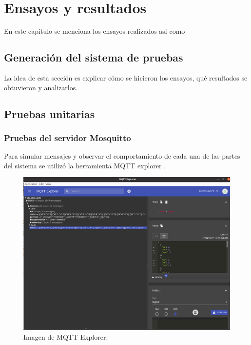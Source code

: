 
\chapter{Ensayos y resultados} %

En este capítulo se menciona los ensayos realizados asi como 

\label{Chapter4} %


\section{Generación del sistema de pruebas}
\label{sec:pruebasHW}

La idea de esta sección es explicar cómo se hicieron los ensayos, qué resultados se obtuvieron y analizarlos.
\section{Pruebas unitarias}
\subsection{Pruebas del servidor Mosquitto}
Para simular mensajes y observar el comportamiento de cada una de las partes del sistema se utilizó la herramienta MQTT explorer   \citep{WEBSITE:29}.

\begin{figure}[ht]
	\centering
	\includegraphics[scale=.25]{./Figures/mqtt-explorer.png}
	\caption{Imagen de MQTT Explorer.}
	\label{fig:MQTT Explorer}
\end{figure}

